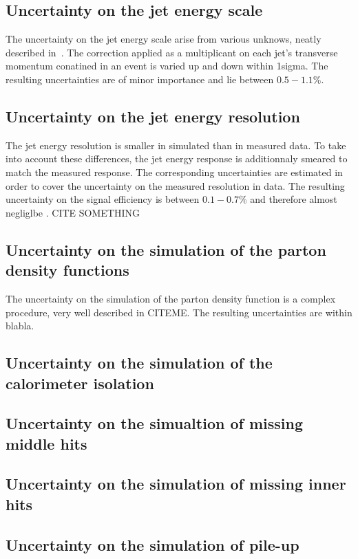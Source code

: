 \subsection*{Uncertainty on the jet energy scale}
The uncertainty on the jet energy scale arise from various unknows, neatly described in~\cite{bib:CMS:JME_PAS}.
The correction applied as a multiplicant on each jet's transverse momentum conatined in an event is varied up and down within 1sigma.
The resulting uncertainties are of minor importance and lie between $0.5-1.1\%$.

\subsection*{Uncertainty on the jet energy resolution}
The jet energy resolution is smaller in simulated than in measured data.
To take into account these differences, the jet energy response is additionnaly smeared to match the measured response.
The corresponding uncertainties are estimated in order to cover the uncertainty on the measured resolution in data.
The resulting uncertainty on the signal efficiency is between $0.1-0.7\%$ and therefore almost negliglbe . CITE SOMETHING

\subsection*{Uncertainty on the simulation of the parton density functions}
The uncertainty on the simulation of the parton density function is a complex procedure, very well described in CITEME.
The resulting uncertainties are within blabla.

\subsection*{Uncertainty on the simulation of the calorimeter isolation}
\subsection*{Uncertainty on the simualtion of missing middle hits}
\subsection*{Uncertainty on the simulation of missing inner hits}
\subsection*{Uncertainty on the simulation of pile-up}
